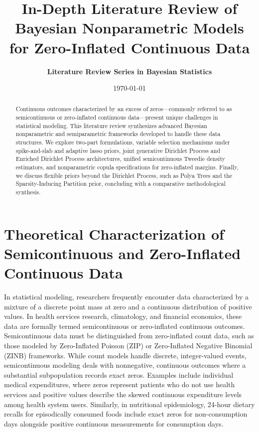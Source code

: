 \documentclass[11pt, a4paper]{article}
\title{\textbf{In-Depth Literature Review of Bayesian Nonparametric Models for Zero-Inflated Continuous Data}}
\author{\textbf{Literature Review Series in Bayesian Statistics}}
\date{\today}
\begin{document}
\maketitle

\begin{abstract}
Continuous outcomes characterized by an excess of zeros—commonly referred to as semicontinuous or zero-inflated continuous data—present unique challenges in statistical modeling. This literature review synthesizes advanced Bayesian nonparametric and semiparametric frameworks developed to handle these data structures. We explore two-part formulations, variable selection mechanisms under spike-and-slab and adaptive lasso priors, joint generative Dirichlet Process and Enriched Dirichlet Process architectures, unified semicontinuous Tweedie density estimators, and nonparametric copula specifications for zero-inflated margins. Finally, we discuss flexible priors beyond the Dirichlet Process, such as Polya Trees and the Sparsity-Inducing Partition prior, concluding with a comparative methodological synthesis.
\end{abstract}

\section{Theoretical Characterization of Semicontinuous and Zero-Inflated Continuous Data}

In statistical modeling, researchers frequently encounter data characterized by a mixture of a discrete point mass at zero and a continuous distribution of positive values.\cite{olsen2001, tooze2002, albert2005} In health services research, climatology, and financial economics, these data are formally termed semicontinuous or zero-inflated continuous outcomes.\cite{olsen2001, craiu2012, duan1983} Semicontinuous data must be distinguished from zero-inflated count data, such as those modeled by Zero-Inflated Poisson (ZIP) or Zero-Inflated Negative Binomial (ZINB) frameworks.\cite{lambert1992} While count models handle discrete, integer-valued events, semicontinuous modeling deals with nonnegative, continuous outcomes where a substantial subpopulation records exact zeros.\cite{olsen2001, albert2005, duan1983} Examples include individual medical expenditures, where zeros represent patients who do not use health services and positive values describe the skewed continuous expenditure levels among health system users.\cite{olsen2001, neelon2010} Similarly, in nutritional epidemiology, 24-hour dietary recalls for episodically consumed foods include exact zeros for non-consumption days alongside positive continuous measurements for consumption days.\cite{tooze2006, kipnis2009}
\end{document}
